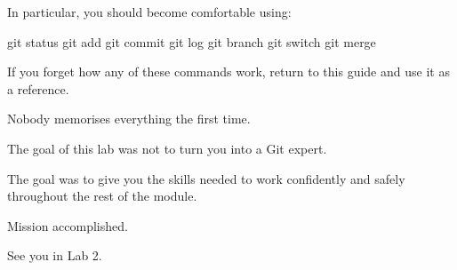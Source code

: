 \documentclass{csc2059practical}
\begin{document}
In particular, you should become comfortable using:

\begin{terminalplain}
git status
git add
git commit
git log
git branch
git switch
git merge
\end{terminalplain}
If you forget how any of these commands work, return to this guide and use it as a reference.

Nobody memorises everything the first time.

The goal of this lab was not to turn you into a Git expert.

The goal was to give you the skills needed to work confidently and safely throughout the rest of the module.

Mission accomplished.

See you in Lab 2.
\end{document}
